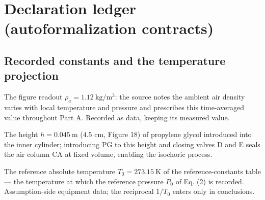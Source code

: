 
\section*{Declaration ledger (autoformalization contracts)}

\subsection*{Recorded constants and the temperature projection}

\begin{definition}
\label{def:IPhO2026Problems_problem_IPhO_2026_4_A_5:ambientAirDensity}
The figure readout $\rho_a = 1.12\ \mathrm{kg/m^3}$: the source notes the
ambient air density varies with local temperature and pressure and
prescribes this time-averaged value throughout Part A.  Recorded as data,
keeping its measured value.
\end{definition}

\begin{definition}
\label{def:IPhO2026Problems_problem_IPhO_2026_4_A_5:pgHeight}
The height $h = 0.045\ \mathrm{m}$ ($4.5$ cm, Figure 18) of propylene
glycol introduced into the inner cylinder; introducing PG to this height
and closing valves D and E seals the air column CA at fixed volume,
enabling the isochoric process.
\end{definition}

\begin{definition}
\label{def:IPhO2026Problems_problem_IPhO_2026_4_A_5:referenceAbsTemperature}
The reference absolute temperature $T_0 = 273.15\ \mathrm{K}$ of the
reference-constants table --- the temperature at which the reference
pressure $P_0$ of Eq. (2) is recorded.  Assumption-side equipment data;
the reciprocal $1/T_0$ enters only in conclusions.
\end{definition}


